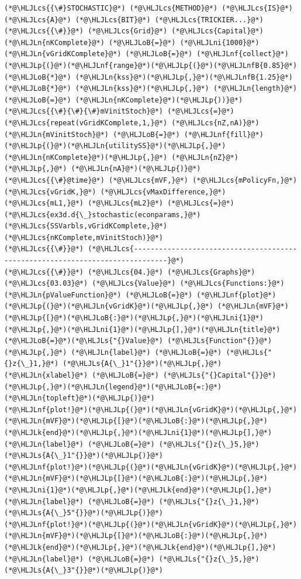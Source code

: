 \documentclass[12pt,a4paper]{article}
\newcommand{\HLJLk}[1]{\textcolor[RGB]{148,91,176}{\textbf{#1}}}
\newcommand{\HLJLn}[1]{#1}
\newcommand{\HLJLnf}[1]{\textcolor[RGB]{66,102,213}{#1}}
\newcommand{\HLJLs}[1]{\textcolor[RGB]{201,61,57}{#1}}
\newcommand{\HLJLnfB}[1]{\textcolor[RGB]{59,151,46}{#1}}
\newcommand{\HLJLni}[1]{\textcolor[RGB]{59,151,46}{#1}}
\newcommand{\HLJLoB}[1]{\textcolor[RGB]{102,102,102}{\textbf{#1}}}
\newcommand{\HLJLp}[1]{#1}
\newcommand{\HLJLcs}[1]{\textcolor[RGB]{153,153,119}{\textit{#1}}}
\begin{document}
\begin{lstlisting}
(*@\HLJLcs{{\#}STOCHASTIC}@*) (*@\HLJLcs{METHOD}@*) (*@\HLJLcs{IS}@*) (*@\HLJLcs{A}@*) (*@\HLJLcs{BIT}@*) (*@\HLJLcs{TRICKIER...}@*)
(*@\HLJLcs{{\#}}@*) (*@\HLJLcs{Grid}@*) (*@\HLJLcs{Capital}@*)
(*@\HLJLn{nKComplete}@*) (*@\HLJLoB{=}@*) (*@\HLJLni{1000}@*)
(*@\HLJLn{vGridKComplete}@*) (*@\HLJLoB{=}@*) (*@\HLJLnf{collect}@*)(*@\HLJLp{(}@*)(*@\HLJLnf{range}@*)(*@\HLJLp{(}@*)(*@\HLJLnfB{0.85}@*) (*@\HLJLoB{*}@*) (*@\HLJLn{kss}@*)(*@\HLJLp{,}@*)(*@\HLJLnfB{1.25}@*) (*@\HLJLoB{*}@*) (*@\HLJLn{kss}@*)(*@\HLJLp{,}@*) (*@\HLJLn{length}@*) (*@\HLJLoB{=}@*) (*@\HLJLn{nKComplete}@*)(*@\HLJLp{))}@*)
(*@\HLJLcs{{\#}{\#}{\#}mVinitStoch}@*) (*@\HLJLcs{=}@*) (*@\HLJLcs{repeat(vGridKComplete,1,}@*) (*@\HLJLcs{nZ,nA)}@*)
(*@\HLJLn{mVinitStoch}@*) (*@\HLJLoB{=}@*) (*@\HLJLnf{fill}@*)(*@\HLJLp{(}@*)(*@\HLJLn{utilitySS}@*)(*@\HLJLp{,}@*) (*@\HLJLn{nKComplete}@*)(*@\HLJLp{,}@*) (*@\HLJLn{nZ}@*)(*@\HLJLp{,}@*) (*@\HLJLn{nA}@*)(*@\HLJLp{)}@*)
(*@\HLJLcs{{\#}@time}@*) (*@\HLJLcs{mVF,}@*) (*@\HLJLcs{mPolicyFn,}@*) (*@\HLJLcs{vGridK,}@*) (*@\HLJLcs{vMaxDifference,}@*) (*@\HLJLcs{mL1,}@*) (*@\HLJLcs{mL2}@*) (*@\HLJLcs{=}@*) (*@\HLJLcs{ex3d.d{\_}stochastic(econparams,}@*) (*@\HLJLcs{SSVarbls,vGridKComplete,}@*) (*@\HLJLcs{nKComplete,mVinitStoch)}@*)
(*@\HLJLcs{{\#}}@*) (*@\HLJLcs{------------------------------------------------------------------------------}@*)
(*@\HLJLcs{{\#}}@*) (*@\HLJLcs{04.}@*) (*@\HLJLcs{Graphs}@*) (*@\HLJLcs{03.03}@*) (*@\HLJLcs{Value}@*) (*@\HLJLcs{Functions:}@*)
(*@\HLJLn{pValueFunction}@*) (*@\HLJLoB{=}@*) (*@\HLJLnf{plot}@*)(*@\HLJLp{(}@*)(*@\HLJLn{vGridK}@*)(*@\HLJLp{,}@*) (*@\HLJLn{mVF}@*)(*@\HLJLp{[}@*)(*@\HLJLoB{:}@*)(*@\HLJLp{,}@*)(*@\HLJLni{1}@*)(*@\HLJLp{,}@*)(*@\HLJLni{1}@*)(*@\HLJLp{],}@*)(*@\HLJLn{title}@*)(*@\HLJLoB{=}@*)(*@\HLJLs{"{}Value}@*) (*@\HLJLs{Function"{}}@*)(*@\HLJLp{,}@*) (*@\HLJLn{label}@*) (*@\HLJLoB{=}@*) (*@\HLJLs{"{}z{\_}1,}@*) (*@\HLJLs{A{\_}1"{}}@*)(*@\HLJLp{,}@*) (*@\HLJLn{xlabel}@*) (*@\HLJLoB{=}@*) (*@\HLJLs{"{}Capital"{}}@*)(*@\HLJLp{,}@*)(*@\HLJLn{legend}@*)(*@\HLJLoB{=:}@*)(*@\HLJLn{topleft}@*)(*@\HLJLp{)}@*)
(*@\HLJLnf{plot!}@*)(*@\HLJLp{(}@*)(*@\HLJLn{vGridK}@*)(*@\HLJLp{,}@*) (*@\HLJLn{mVF}@*)(*@\HLJLp{[}@*)(*@\HLJLoB{:}@*)(*@\HLJLp{,}@*)(*@\HLJLk{end}@*)(*@\HLJLp{,}@*)(*@\HLJLni{1}@*)(*@\HLJLp{],}@*) (*@\HLJLn{label}@*) (*@\HLJLoB{=}@*) (*@\HLJLs{"{}z{\_}5,}@*) (*@\HLJLs{A{\_}1"{}}@*)(*@\HLJLp{)}@*)
(*@\HLJLnf{plot!}@*)(*@\HLJLp{(}@*)(*@\HLJLn{vGridK}@*)(*@\HLJLp{,}@*) (*@\HLJLn{mVF}@*)(*@\HLJLp{[}@*)(*@\HLJLoB{:}@*)(*@\HLJLp{,}@*)(*@\HLJLni{1}@*)(*@\HLJLp{,}@*)(*@\HLJLk{end}@*)(*@\HLJLp{],}@*) (*@\HLJLn{label}@*) (*@\HLJLoB{=}@*) (*@\HLJLs{"{}z{\_}1,}@*) (*@\HLJLs{A{\_}5"{}}@*)(*@\HLJLp{)}@*)
(*@\HLJLnf{plot!}@*)(*@\HLJLp{(}@*)(*@\HLJLn{vGridK}@*)(*@\HLJLp{,}@*) (*@\HLJLn{mVF}@*)(*@\HLJLp{[}@*)(*@\HLJLoB{:}@*)(*@\HLJLp{,}@*)(*@\HLJLk{end}@*)(*@\HLJLp{,}@*)(*@\HLJLk{end}@*)(*@\HLJLp{],}@*) (*@\HLJLn{label}@*) (*@\HLJLoB{=}@*) (*@\HLJLs{"{}z{\_}5,}@*) (*@\HLJLs{A{\_}3"{}}@*)(*@\HLJLp{)}@*)
\end{lstlisting}
\end{document}
